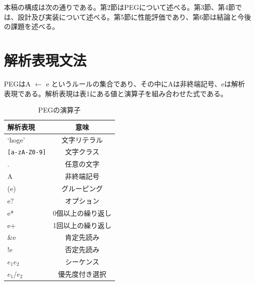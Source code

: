 \documentclass[submit]{ipsj}
\begin{document}



本稿の構成は次の通りである。第2節はPEGについて述べる。第3節、第4節では、設計及び実装について述べる。第5節に性能評価であり、第6節は結論と今後の課題を述べる。\\


\section{解析表現文法}

PEGはA $\leftarrow$ e というルールの集合であり、その中にAは非終端記号、eは解析表現である。解析表現は表1にある値と演算子を組み合わせた式である。




\begin{table}[h]
	\caption{PEGの演算子}
	\centering
\begin{tabular}[t]{lc}
	\hline\hline
	 解析表現 & 意味 \\\hline
	 `hoge' &  文字リテラル \\
	\texttt{[a-zA-Z0-9]} & 文字クラス\\
	 . & 任意の文字 \\
	 A & 非終端記号 \\
	 (e) & グルーピング \\
	 e? & オプション \\
	 e* & 0個以上の繰り返し \\
	 e+ & 1回以上の繰り返し \\
	 \&e & 肯定先読み　\\
	 !e & 否定先読み \\
	 $e_1$$e_2$ & シーケンス \\
	 $e_1$/$e_2$ & 優先度付き選択 \\\hline
\end{tabular}
\end{table}
\end{document}
